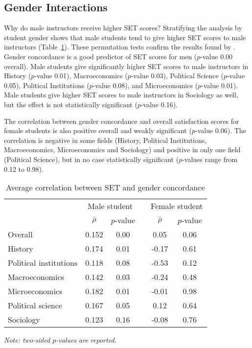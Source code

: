 \documentclass[12pt]{article}
\begin{document}
\subsection{Gender Interactions}
Why do male instructors receive higher SET scores? 
Stratifying the analysis by student gender shows that
male students tend to give higher SET scores to male instructors 
(Table~\ref{tab:genderconcordance}). 
These permutation tests confirm the results found by \citet{Boring2015}. 
Gender concordance is a good predictor of SET scores for men ($p$-value 0.00 overall). 
Male students give significantly higher SET scores to male instructors in  
History ($p$-value 0.01), Macroeconomics ($p$-value 0.03), Political Science ($p$-value 0.05), 
Political Institutions ($p$-value 0.08), and Microeconomics ($p$-value 0.01). 
Male students give higher SET scores to male instructors in Sociology as well, but the
effect is not statistically significant ($p$-value 0.16). 

The correlation between gender concordance and overall satisfaction scores 
for female students is also positive overall and weakly significant ($p$-value 0.06). 
The correlation is negative in some fields (History, Political Institutions, 
Macroeconomics, Microeconomics and Sociology) and positive in only one field 
(Political Science), but in no case statistically significant 
($p$-values range from 0.12 to 0.98).

\begin{table}[htbp]
  \centering
  \footnotesize 
  \caption{Average correlation between SET and gender concordance}
    \begin{tabular}{lccccc}
    \toprule 
          & \multicolumn{2}{c}{Male student}  &  & \multicolumn{2}{c}{Female student} \\
      & $\bar{\rho}$  &  $p$-value &  & $\bar{\rho}$  &  $p$-value    \\
   \midrule
      \quad  Overall                &  0.152       & 0.00 & &  0.05       & 0.06     \\
      \quad  History                &  0.174       & 0.01 & & -0.17       & 0.61     \\
      \quad  Political institutions &  0.118       & 0.08 & & -0.53       & 0.12     \\
      \quad  Macroeconomics    &  0.142      & 0.03 & & -0.24       & 0.48     \\
      \quad  Microeconomics     &  0.182       & 0.01 & &  -0.01      & 0.98     \\
      \quad  Political science     &  0.167       & 0.05 & &  0.12       & 0.64     \\
      \quad  Sociology              &  0.123       & 0.16 & & -0.08       & 0.76     \\
    \bottomrule
    \end{tabular}%
 \label{tab:genderconcordance}%
  
  \textit{Note: two-sided $p$-values are reported.}
\end{table}%
\normalsize
\end{document}
